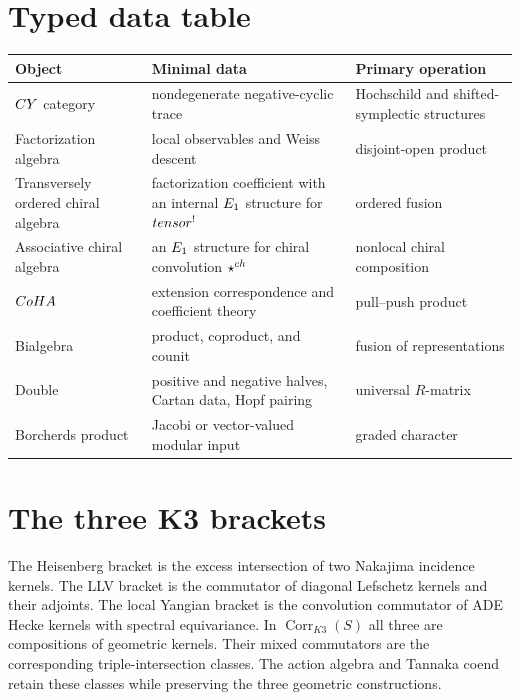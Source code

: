 \chapter{Typed data table}
\begin{center}
\small
\begin{tabularx}{0.98\textwidth}{@{}>{\raggedright\arraybackslash}p{}>{\raggedright\arraybackslash}X>{\raggedright\arraybackslash}p{}@{}}
\toprule
\textbf{Object}&\textbf{Minimal data}&\textbf{Primary operation}\\
\midrule
$CY$ category&nondegenerate negative-cyclic trace&Hochschild and shifted-symplectic structures\\
Factorization algebra&local observables and Weiss descent&disjoint-open product\\
Transversely ordered chiral algebra&factorization coefficient with an internal $E_1$ structure for $tensor^!$&ordered fusion\\
Associative chiral algebra&an $E_1$ structure for chiral convolution $\mathbin{\star^{ch}}$&nonlocal chiral composition\\
$CoHA$&extension correspondence and coefficient theory&pull--push product\\
Bialgebra&product, coproduct, and counit&fusion of representations\\
Double&positive and negative halves, Cartan data, Hopf pairing&universal $R$-matrix\\
Borcherds product&Jacobi or vector-valued modular input&graded character\\
\bottomrule
\end{tabularx}
\end{center}

\chapter{The three K3 brackets}
The Heisenberg bracket is the excess intersection of two Nakajima incidence kernels.  The LLV bracket is the commutator of diagonal Lefschetz kernels and their adjoints.  The local Yangian bracket is the convolution commutator of ADE Hecke kernels with spectral equivariance.  In $\operatorname{Corr}_{K3}(S)$ all three are compositions of geometric kernels.  Their mixed commutators are the corresponding triple-intersection classes.  The action algebra and Tannaka coend retain these classes while preserving the three geometric constructions.

